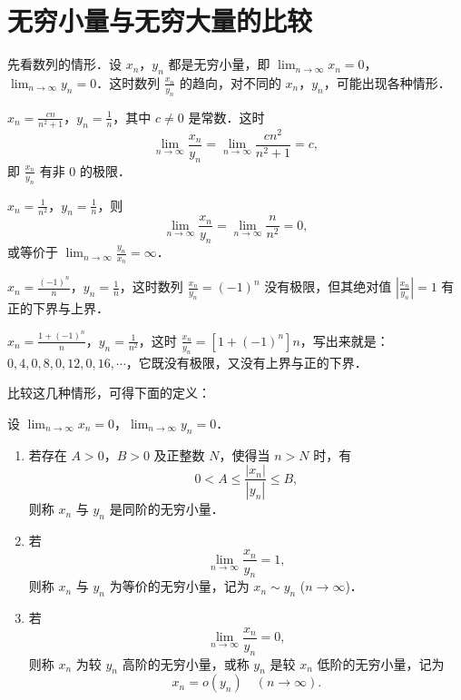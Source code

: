 \section{无穷小量与无穷大量的比较}\label{sec:3.5}

先看数列的情形．设 $x_n$，$y_n$ 都是无穷小量，即 $\lim_{n \to \infty} x_n = 0$，$\lim_{n \to \infty} y_n = 0$．这时数列 $\frac{x_n}{y_n}$ 的趋向，对不同的 $x_n$，$y_n$，可能出现各种情形．

\begin{example}\label{ex:3-5-1}
$x_n = \frac{cn}{n^2+1}$，$y_n = \frac{1}{n}$，其中 $c \neq 0$ 是常数．这时
\[
\lim_{n \to \infty} \frac{x_n}{y_n} = \lim_{n \to \infty} \frac{cn^2}{n^2+1} = c,
\]
即 $\frac{x_n}{y_n}$ 有非 $0$ 的极限．
\end{example}

\begin{example}\label{ex:3-5-2}
$x_n = \frac{1}{n^2}$，$y_n = \frac{1}{n}$，则
\[
\lim_{n \to \infty} \frac{x_n}{y_n} = \lim_{n \to \infty} \frac{n}{n^2} = 0,
\]
或等价于 $\lim_{n \to \infty} \frac{y_n}{x_n} = \infty$．
\end{example}

\begin{example}\label{ex:3-5-3}
$x_n = \frac{(-1)^n}{n}$，$y_n = \frac{1}{n}$，这时数列 $\frac{x_n}{y_n} = (-1)^n$ 没有极限，但其绝对值 $\left|\frac{x_n}{y_n}\right| = 1$ 有正的下界与上界．
\end{example}

\begin{example}\label{ex:3-5-4}
$x_n = \frac{1+(-1)^n}{n}$，$y_n = \frac{1}{n^2}$，这时 $\frac{x_n}{y_n} = [1+(-1)^n]n$，写出来就是：$0, 4, 0, 8, 0, 12, 0, 16, \cdots$，它既没有极限，又没有上界与正的下界．
\end{example}

比较这几种情形，可得下面的定义：

\begin{definition}\label{def:3-11}
设 $\lim_{n \to \infty} x_n = 0$，$\lim_{n \to \infty} y_n = 0$．
\begin{enumerate}[label=(\arabic*)]
\item 若存在 $A > 0$，$B > 0$ 及正整数 $N$，使得当 $n > N$ 时，有
\[
0 < A \leqslant \frac{|x_n|}{|y_n|} \leqslant B,
\]
则称 $x_n$ 与 $y_n$ 是同阶的无穷小量．
\item 若
\[
\lim_{n \to \infty} \frac{x_n}{y_n} = 1,
\]
则称 $x_n$ 与 $y_n$ 为等价的无穷小量，记为 $x_n \sim y_n$ ($n \to \infty$)．
\item 若
\[
\lim_{n \to \infty} \frac{x_n}{y_n} = 0,
\]
则称 $x_n$ 为较 $y_n$ 高阶的无穷小量，或称 $y_n$ 是较 $x_n$ 低阶的无穷小量，记为
\[
x_n = o(y_n) \quad (n \to \infty).
\]
\end{enumerate}
\end{definition}

